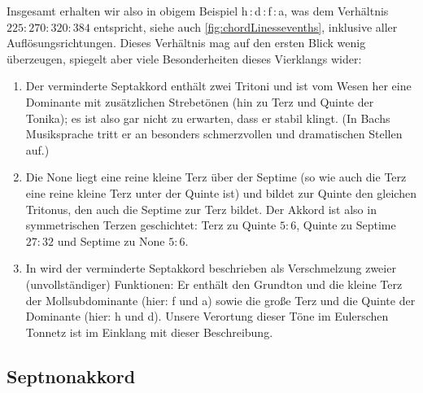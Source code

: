 Insgesamt erhalten wir also in obigem Beispiel \naturalm
h\,:\,d\,:\,f\,:\,\flatp a, was dem Verhältnis $225:270:320:384$ entspricht,
siehe auch \cref{fig:chordLinessevenths}, inklusive aller Auflösungsrichtungen.
Dieses Verhältnis mag auf den ersten Blick wenig überzeugen, spiegelt aber viele
Besonderheiten dieses Vierklangs wider:
\begin{enumerate}
\item Der verminderte Septakkord enthält zwei Tritoni und ist vom Wesen her eine
  Dominante mit zusätzlichen Strebetönen (hin zu Terz und Quinte der Tonika); es
  ist also gar nicht zu erwarten, dass er stabil klingt.  (In Bachs Musiksprache
  tritt er an besonders schmerzvollen und dramatischen Stellen auf.)
\item Die None liegt eine reine kleine Terz über der Septime (so wie auch die
  Terz eine reine kleine Terz unter der Quinte ist) und bildet zur Quinte den
  gleichen Tritonus, den auch die Septime zur Terz bildet.  Der Akkord ist also
  in symmetrischen Terzen geschichtet: Terz zu Quinte $5:6$, Quinte zu Septime
  $27:32$ und Septime zu None $5:6$.
\item In \cite[S.\,92ff.]{deLaMotte} wird der verminderte Septakkord beschrieben
  als Verschmelzung zweier (unvollständiger) Funktionen: Er enthält den Grundton
  und die kleine Terz der Mollsubdominante (hier: f und \flat a) sowie die große
  Terz und die Quinte der Dominante (hier: h und d).  Unsere Verortung dieser
  Töne im Eulerschen Tonnetz ist im Einklang mit dieser Beschreibung.
\end{enumerate}

\subsection{Septnonakkord}
\label{sec:dom79syn}

